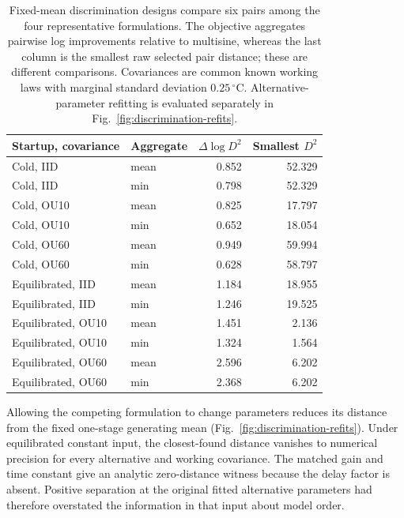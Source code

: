 \documentclass[11pt]{article}
\begin{document}
\begin{table}[tbp]
\centering\small
\begin{tabular}{llrr}
\toprule
Startup, covariance & Aggregate & $\Delta\log D^2$ & Smallest $D^2$ \\
\midrule
Cold, IID & mean & 0.852 & 52.329 \\
Cold, IID & min & 0.798 & 52.329 \\
Cold, OU10 & mean & 0.825 & 17.797 \\
Cold, OU10 & min & 0.652 & 18.054 \\
Cold, OU60 & mean & 0.949 & 59.994 \\
Cold, OU60 & min & 0.628 & 58.797 \\
Equilibrated, IID & mean & 1.184 & 18.955 \\
Equilibrated, IID & min & 1.246 & 19.525 \\
Equilibrated, OU10 & mean & 1.451 & 2.136 \\
Equilibrated, OU10 & min & 1.324 & 1.564 \\
Equilibrated, OU60 & mean & 2.596 & 6.202 \\
Equilibrated, OU60 & min & 2.368 & 6.202 \\
\bottomrule
\end{tabular}
\caption{Fixed-mean discrimination designs compare six pairs among the four representative formulations. The objective aggregates pairwise log improvements relative to multisine, whereas the last column is the smallest raw selected pair distance; these are different comparisons. Covariances are common known working laws with marginal standard deviation $0.25\,{}^\circ\mathrm C$. Alternative-parameter refitting is evaluated separately in Fig.~\ref{fig:discrimination-refits}.}
\label{tab:discrimination-design}
\end{table}



Allowing the competing formulation to change parameters reduces its distance
from the fixed one-stage generating mean
(Fig.~\ref{fig:discrimination-refits}). Under equilibrated constant input, the
closest-found distance vanishes to numerical precision for every alternative
and working covariance. The matched gain and time constant give an analytic
zero-distance witness because the delay factor is absent. Positive separation
at the original fitted alternative parameters had therefore overstated the
information in that input about model order.
\end{document}
